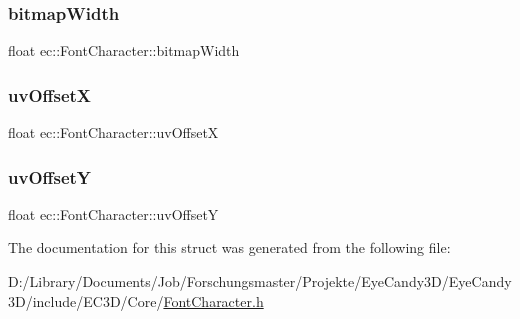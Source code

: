 \subsubsection{\texorpdfstring{bitmap\+Width}{bitmapWidth}}
{\footnotesize\ttfamily float ec\+::\+Font\+Character\+::bitmap\+Width}

\mbox{\label{structec_1_1_font_character_a808bd1f1774bbbb21bd845f6868dcacc}} 
\subsubsection{\texorpdfstring{uv\+OffsetX}{uvOffsetX}}
{\footnotesize\ttfamily float ec\+::\+Font\+Character\+::uv\+OffsetX}

\mbox{\label{structec_1_1_font_character_a6135b99b5b442227b3dec5974f7d6a90}} 
\subsubsection{\texorpdfstring{uv\+OffsetY}{uvOffsetY}}
{\footnotesize\ttfamily float ec\+::\+Font\+Character\+::uv\+OffsetY}



The documentation for this struct was generated from the following file\+:\begin{DoxyCompactItemize}
\item 
D\+:/\+Library/\+Documents/\+Job/\+Forschungsmaster/\+Projekte/\+Eye\+Candy3\+D/\+Eye\+Candy3\+D/include/\+E\+C3\+D/\+Core/\mbox{\hyperlink{_font_character_8h}{Font\+Character.\+h}}\end{DoxyCompactItemize}
